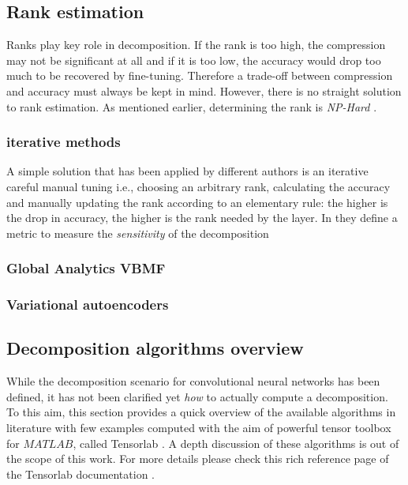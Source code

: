 \subsection{Rank estimation}
Ranks play key role in decomposition. If the rank is too high, the compression may not be significant at all and if it is too low, the accuracy would drop too much to be recovered by fine-tuning. Therefore a trade-off between compression and accuracy must always be kept in mind. 
\newline 
However, there is no straight solution to rank estimation. As mentioned earlier, determining the rank is \emph{NP-Hard} \parencite{rank-hard1}\parencite{rank-hard2}\parencite{rank-hard3}. \\
 
\subsubsection{iterative methods}
A simple solution that has been applied by different authors is an iterative careful manual tuning \parencite{astrid2017} \parencite{lebedev2014} i.e., choosing an arbitrary rank, calculating the accuracy and manually updating the rank according to an elementary rule: the higher is the drop in accuracy, the higher is the rank needed by the layer.
\newline 
In they define a metric to measure the \emph{sensitivity} of the decomposition 

\subsubsection{Global Analytics VBMF}

\subsubsection{Variational autoencoders}


\subsection{Decomposition algorithms overview}
While the decomposition scenario for convolutional neural networks has been defined, it has not been clarified yet \emph{how} to actually compute a decomposition. To this aim, this section provides a quick overview of the available algorithms in literature with few examples computed with the aim of powerful tensor toolbox for $MATLAB$, called Tensorlab \parencite{WTensorlab}. \newline
A depth discussion of these algorithms is out of the scope of this work. For more details please check this rich reference page of the Tensorlab documentation \parencite{WTensorlab-ref}.

